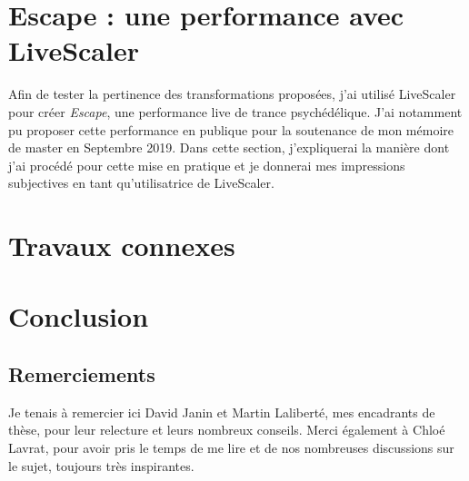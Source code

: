 \documentclass{article}
\begin{document}








\section{Escape : une performance avec LiveScaler }
Afin de tester la pertinence des transformations proposées, j'ai utilisé LiveScaler pour créer \emph{Escape}, une performance live de trance psychédélique. J'ai notamment pu proposer cette performance en publique pour la soutenance de mon mémoire de master en Septembre 2019. Dans cette section, j'expliquerai la manière dont j'ai procédé pour cette mise en pratique et je donnerai mes impressions subjectives en tant qu'utilisatrice de LiveScaler.





\section{Travaux connexes}



\section{Conclusion}


\subsection{Remerciements}
Je tenais à remercier ici David Janin et Martin Laliberté, mes encadrants de thèse, pour leur relecture et leurs nombreux conseils. Merci également à Chloé Lavrat, pour avoir pris le temps de me lire et de nos nombreuses discussions sur le sujet, toujours très inspirantes.

\newpage

 

\end{document}
